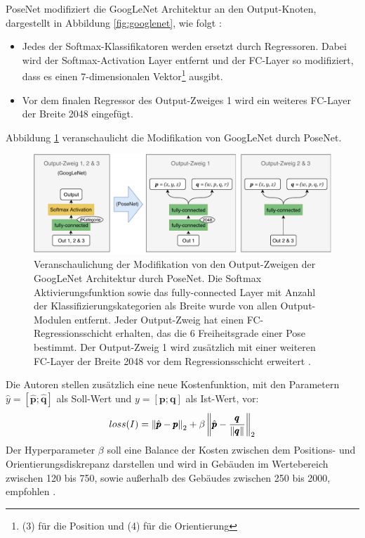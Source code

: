 PoseNet modifiziert die GoogLeNet Architektur an den Output-Knoten, dargestellt in Abbildung \ref{fig:googlenet}, wie folgt \cite{kendallPoseNetConvolutionalNetwork2015}:
\begin{itemize}
	\item Jedes der Softmax-Klassifikatoren werden ersetzt durch Regressoren. Dabei wird der Softmax-Activation Layer entfernt und der FC-Layer so modifiziert, dass es einen 7-dimensionalen Vektor\footnote{(3) für die Position und (4) für die Orientierung} ausgibt.
	\item Vor dem finalen Regressor des Output-Zweiges 1 wird ein weiteres FC-Layer der Breite 2048 eingefügt.

\end{itemize}
Abbildung \ref{fig:posenet_mods} veranschaulicht die Modifikation von GoogLeNet durch PoseNet.
\vspace*{1.2cm}
 \begin{figure}[H]
	\centering
	\includegraphics[width=\textwidth]{images/googlenet/posenet_diagram2.pdf}
	\caption{Veranschaulichung der Modifikation von den Output-Zweigen der GoogLeNet Architektur durch PoseNet. Die Softmax Aktivierungsfunktion sowie das fully-connected Layer mit Anzahl der Klassifizierungskategorien als Breite wurde von allen Output-Modulen entfernt. Jeder Output-Zweig hat einen FC-Regressionsschicht erhalten, das die 6 Freiheitsgrade einer Pose bestimmt. Der Output-Zweig 1 wird zusätzlich mit einer weiteren FC-Layer der Breite 2048 vor dem Regressionsschicht erweitert \cite{kendallPoseNetConvolutionalNetwork2015}.}
	\label{fig:posenet_mods}
\end{figure}
\vspace*{1.5cm}

Die Autoren \citet{kendallPoseNetConvolutionalNetwork2015} stellen zusätzlich eine neue Kostenfunktion, mit den Parametern $\hat{y} = [\hat{\pmb{p}};\hat{\pmb{q}}]$ als Soll-Wert und $y = [\pmb{p};\pmb{q}]$ als Ist-Wert, vor:
\begin{equation}
	\label{eq:posenet_loss}
	loss(I) = \left\lVert \hat{\pmb{p}} - \pmb{p} \right\rVert_2 + \beta \left\lVert \hat{\pmb{p}} - \frac{\pmb{q}}{\left\lVert\pmb{q}\right\rVert}\right\rVert_2
\end{equation}
Der Hyperparameter $\beta$ soll eine Balance der Kosten zwischen dem Positions- und Orientierungsdiskrepanz darstellen und wird in Gebäuden im Wertebereich zwischen 120 bis 750, sowie außerhalb des Gebäudes zwischen 250 bis 2000, empfohlen \cite{kendallPoseNetConvolutionalNetwork2015}. 